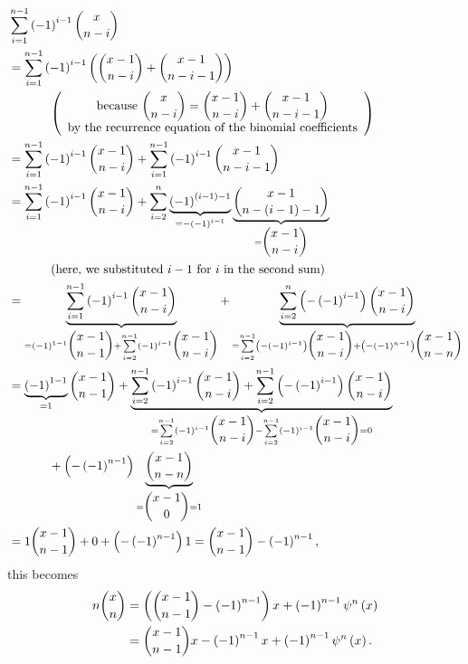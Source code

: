\documentclass[numbers=enddot,12pt,final,onecolumn,notitlepage]{scrartcl}%
\begin{document}
\begin{align*}
&  \sum_{i=1}^{n-1}\left(  -1\right)  ^{i-1}\dbinom{x}{n-i}\\
&  =\sum_{i=1}^{n-1}\left(  -1\right)  ^{i-1}\left(  \dbinom{x-1}{n-i}%
+\dbinom{x-1}{n-i-1}\right) \\
&  \ \ \ \ \ \ \ \ \ \ \left(
\begin{array}
[c]{c}%
\text{because }\dbinom{x}{n-i}=\dbinom{x-1}{n-i}+\dbinom{x-1}{n-i-1}\\
\text{by the recurrence equation of the binomial coefficients}%
\end{array}
\right) \\
&  =\sum_{i=1}^{n-1}\left(  -1\right)  ^{i-1}\dbinom{x-1}{n-i}+\sum
_{i=1}^{n-1}\left(  -1\right)  ^{i-1}\dbinom{x-1}{n-i-1}\\
&  =\sum_{i=1}^{n-1}\left(  -1\right)  ^{i-1}\dbinom{x-1}{n-i}+\sum_{i=2}%
^{n}\underbrace{\left(  -1\right)  ^{\left(  i-1\right)  -1}}_{=-\left(
-1\right)  ^{i-1}}\underbrace{\dbinom{x-1}{n-\left(  i-1\right)  -1}%
}_{=\dbinom{x-1}{n-i}}\\
&  \ \ \ \ \ \ \ \ \ \ \left(  \text{here, we substituted }i-1\text{ for
}i\text{ in the second sum}\right) \\
&  =\underbrace{\sum_{i=1}^{n-1}\left(  -1\right)  ^{i-1}\dbinom{x-1}{n-i}%
}_{=\left(  -1\right)  ^{1-1}\dbinom{x-1}{n-1}+\sum\limits_{i=2}^{n-1}\left(
-1\right)  ^{i-1}\dbinom{x-1}{n-i}}+\underbrace{\sum_{i=2}^{n}\left(  -\left(
-1\right)  ^{i-1}\right)  \dbinom{x-1}{n-i}}_{=\sum\limits_{i=2}^{n-1}\left(
-\left(  -1\right)  ^{i-1}\right)  \dbinom{x-1}{n-i}+\left(  -\left(
-1\right)  ^{n-1}\right)  \dbinom{x-1}{n-n}}\\
&  =\underbrace{\left(  -1\right)  ^{1-1}}_{=1}\dbinom{x-1}{n-1}%
+\underbrace{\sum\limits_{i=2}^{n-1}\left(  -1\right)  ^{i-1}\dbinom{x-1}%
{n-i}+\sum\limits_{i=2}^{n-1}\left(  -\left(  -1\right)  ^{i-1}\right)
\dbinom{x-1}{n-i}}_{=\sum\limits_{i=2}^{n-1}\left(  -1\right)  ^{i-1}%
\dbinom{x-1}{n-i}-\sum\limits_{i=2}^{n-1}\left(  -1\right)  ^{i-1}\dbinom
{x-1}{n-i}=0}\\
&  \ \ \ \ \ \ \ \ \ \ +\left(  -\left(  -1\right)  ^{n-1}\right)
\underbrace{\dbinom{x-1}{n-n}}_{=\dbinom{x-1}{0}=1}\\
&  =1\dbinom{x-1}{n-1}+0+\left(  -\left(  -1\right)  ^{n-1}\right)
1=\dbinom{x-1}{n-1}-\left(  -1\right)  ^{n-1},
\end{align*}
this becomes%
\begin{align*}
n\dbinom{x}{n}  &  =\left(  \dbinom{x-1}{n-1}-\left(  -1\right)
^{n-1}\right)  x+\left(  -1\right)  ^{n-1}\psi^{n}\left(  x\right) \\
&  =\dbinom{x-1}{n-1}x-\left(  -1\right)  ^{n-1}x+\left(  -1\right)
^{n-1}\psi^{n}\left(  x\right)  .
\end{align*}
\end{document}
